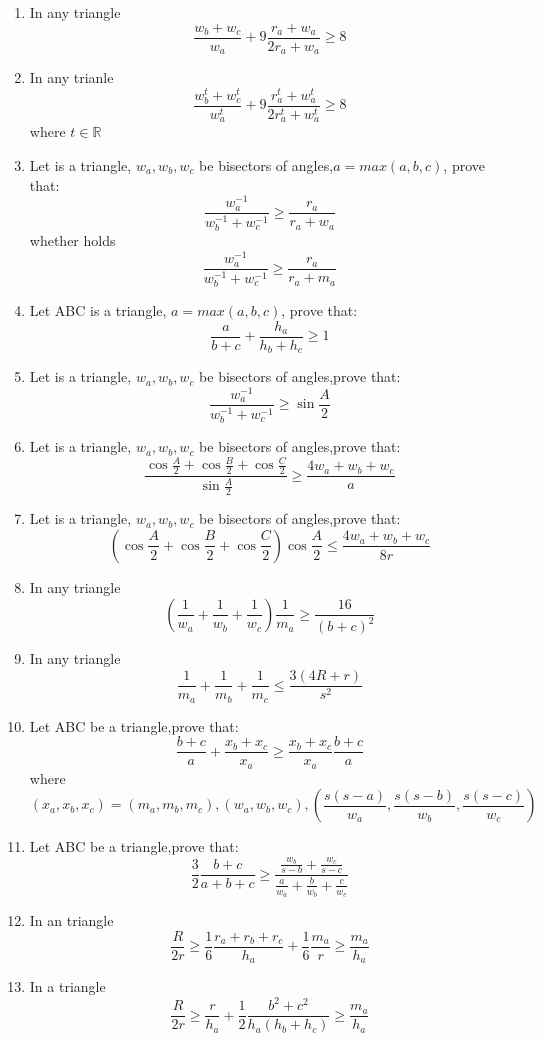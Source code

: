 \documentclass{report}
\begin{document}
\begin{enumerate}
	\item In any triangle$$ \frac {w_b + w_c}{w_a} + 9\frac {r_a + w_a}{2r_a + w_a} \geq 8$$
	\item In any trianle $$\frac {w_b^t + w_c^t}{w_a^t} + 9\frac {r_a^t + w_a^t}{2r_a^t + w_a^t} \geq 8$$where $t\in \mathbb{R}$
	\item Let is a triangle, $ w_a,w_b,w_c$ be bisectors of angles,$ a = max(a,b,c)$, prove that:$$ \frac {w_a^{ - 1}}{w_b^{ - 1} + w_c^{ - 1}} \geq \frac {r_a}{r_a + w_a}$$whether holds$$\frac {w_a^{ - 1}}{w_b^{ - 1} + w_c^{ - 1}} \geq \frac {r_a}{r_a + m_a}$$
	\item Let ABC is a triangle, $ a = max(a,b,c)$, prove that:$$ \frac {a}{b + c} + \frac {h_a}{h_b + h_c} \geq 1$$
	\item Let is a triangle, $ w_a,w_b,w_c$ be bisectors of angles,prove that:$$ \frac {w_a^{ - 1}}{w_b^{ - 1} + w_c^{ - 1}} \geq \sin \frac {A}{2}$$
	\item Let is a triangle, $ w_a,w_b,w_c$ be bisectors of angles,prove that:$$ \frac {\cos\frac {A}{2} + \cos\frac {B}{2} + \cos\frac {C}{2}}{\sin\frac {A}{2}} \geq \frac {4w_a + w_b + w_c}{a}$$
	\item Let is a triangle, $ w_a,w_b,w_c$ be bisectors of angles,prove that:$$ \left( \cos\frac {A}{2} + \cos\frac {B}{2} + \cos\frac {C}{2}\right) \cos\frac {A}{2} \le \frac {4w_a + w_b + w_c}{8r}$$
	\item In any triangle $$ \left( \frac {1}{w_a} + \frac {1}{w_b} + \frac {1}{w_c}\right) \frac {1}{m_a}\geq \frac {16}{(b + c)^2}$$
	\item In any triangle$$ \frac{1}{m_a}+\frac{1}{m_b}+\frac{1}{m_c} \le \frac{3(4R+r)}{s^2}$$
	\item Let ABC be a triangle,prove that:$$ \frac {b + c}{a} + \frac {x_b + x_c}{x_a} \geq \frac {x_b + x_c}{x_a}\frac {b + c}{a}$$where
	$$\left( x_a,x_b,x_c\right)  =\left(m_a,m_b,m_c\right),\left(w_a,w_b,w_c\right),\left(\frac{s(s - a)}{w_a},\frac{s(s - b)}{w_b},\frac{s(s - c)}{w_c} \right)  $$
	\item Let ABC be a triangle,prove that:$$ \frac {3}{2}\frac {b + c}{a + b + c} \geq \frac {\frac {w_b}{s - b} + \frac {w_c}{s - c} }{\frac {a}{w_a} + \frac {b}{w_b} + \frac {c}{w_c} }$$
	\item In an triangle$$\frac {R}{2r} \geq \frac {1}{6}\frac {r_a + r_b + r_c}{h_a} + \frac {1}{6}\frac {m_a}{r} \geq \frac {m_a}{h_a}$$
	\item In a triangle $$\frac {R}{2r} \geq \frac {r}{h_a} + \frac {1}{2}\frac {b^2 + c^2}{h_a(h_b + h_c)} \geq \frac {m_a}{h_a}$$
	

\end{enumerate}
\end{document}
